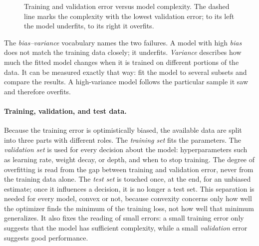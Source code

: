 \begin{figure}[ht]
  \centering
  \vspace{0.3cm}
  \caption{Training and validation error versus model complexity. The dashed
  line marks the complexity with the lowest validation error; to its left the
  model underfits, to its right it overfits.}
  \label{fig:overfit}
\end{figure}

\noindent
The \emph{bias--variance} vocabulary names the two failures. A model with high
\emph{bias} does not match the training data closely; it underfits.
\emph{Variance} describes how much the fitted model changes when it is trained on
different portions of the data. It can be measured exactly that way: fit the
model to several subsets and compare the results. A high-variance model follows
the particular sample it saw and therefore overfits.

\paragraph{Training, validation, and test data.}
Because the training error is optimistically biased, the available data are
split into three parts with different roles. The \emph{training set} fits the
parameters. The \emph{validation set} is used for every decision about the
model: hyperparameters such as learning rate, weight decay, or depth, and when
to stop training. The degree of overfitting is read from the gap between
training and validation error, never from the training data alone. The
\emph{test set} is touched once, at the end, for an unbiased estimate; once it
influences a decision, it is no longer a test set. This separation is needed for
every model, convex or not, because convexity concerns only how well the
optimizer finds the minimum of the training loss, not how well that minimum
generalizes. It also fixes the reading of small errors: a small training error
only suggests that the model has sufficient complexity, while a small
\emph{validation} error suggests good performance.

